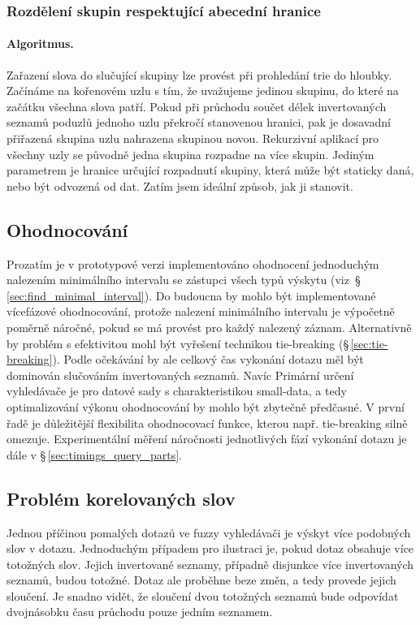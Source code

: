 \documentclass[11pt,letterpaper,oneside,openright]{book}
\begin{document}
\subsubsection{Rozdělení skupin respektující abecední hranice} \label{sec:hybrid_algorithm}
\paragraph{Algoritmus.} Zařazení slova do slučující skupiny lze provést při
prohledání trie do hloubky.  Začínáme na kořenovém uzlu s tím, že uvažujeme
jedinou skupinu, do které na začátku všechna slova patří. Pokud při průchodu
součet délek invertovaných seznamů poduzlů jednoho uzlu překročí stanovenou
hranici, pak je dosavadní přiřazená skupina uzlu nahrazena skupinou novou.
Rekurzivní aplikací pro všechny uzly se původně jedna skupina rozpadne na více
skupin. Jediným parametrem je hranice určující rozpadnutí skupiny, která může
být staticky daná, nebo být odvozená od dat. Zatím jsem ideální způsob, jak ji
stanovit.

\subsection{Ohodnocování}
Prozatím je v prototypové verzi implementováno ohodnocení jednoduchým nalezením
minimálního intervalu se zástupci všech typů výskytu
(viz~\S\,\ref{sec:find_minimal_interval}). Do budoucna by mohlo být
implementované vícefázové ohodnocování, protože nalezení minimálního intervalu
je výpočetně poměrně náročné, pokud se má provést pro každý nalezený záznam.
Alternativně by problém s efektivitou mohl být vyřešení technikou tie-breaking
(\S\,\ref{sec:tie-breaking}). Podle očekávání by ale celkový čas vykonání
dotazu měl být dominován slučováním invertovaných seznamů. Navíc Primární
určení vyhledávače je pro datové sady s charakteristikou small-data, a tedy
optimalizování výkonu ohodnocování by mohlo být zbytečně předčasné. V první
řadě je důležitější flexibilita ohodnocovací funkce, kterou např. tie-breaking
silně omezuje. Experimentální měření náročnosti jednotlivých fází vykonání
dotazu je dále v \S\,\ref{sec:timings_query_parts}.


\subsection{Problém korelovaných slov} \label{sec:correlated_words}
Jednou příčinou pomalých dotazů ve fuzzy vyhledávači je výskyt více podobných
slov v dotazu. Jednoduchým případem pro ilustraci je, pokud dotaz obsahuje více
totožných slov. Jejich invertované seznamy, případně disjunkce více
invertovaných seznamů, budou totožné. Dotaz ale proběhne beze změn, a tedy
provede jejich sloučení. Je snadno vidět, že sloučení dvou totožných seznamů
bude odpovídat dvojnásobku času průchodu pouze jedním seznamem.
\end{document}
